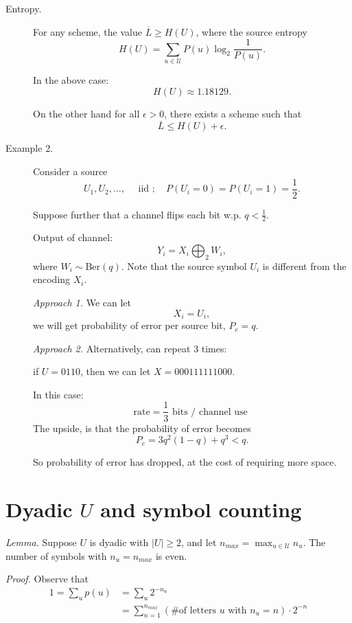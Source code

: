\documentclass[12pt]{extarticle}
\newcommand{\UU}{\mathcal{U}}
\def\UU{\mathcal{U}}
\begin{document}
\begin{description}
  \item[Entropy.] For any scheme, the value $\overline{L} \geq H(U)$, where the source entropy
    \[
      H(U) = \sum_{u \in \mathcal{U}} P(u) \log_2 \frac{1}{P(u)}.
    \]

    In the above case:
    \[
    H(U) \approx 1.18129.
    \]

    On the other hand for all $\epsilon > 0$, there exists a scheme such that
    \[
      \overline{L} \leq H(U) + \epsilon.
    \]

  \item[Example 2.] Consider a source
    \[
      U_1, U_2, \dots, \quad \text{ iid }; \quad P(U_i = 0) = P(U_i = 1) = \frac{1}{2}.
    \]

    Suppose further that a channel flips each bit w.p. $q < \frac{1}{2}$.

    Output of channel:
    \[
      Y_i = X_i \bigoplus_2 W_i,
    \]
    where $W_i \sim \text{Ber}(q)$.  Note that the source symbol $U_i$ is different from the encoding $X_i$.

    {\it Approach 1.} We can let
    \[
      X_i = U_i,
    \]
    we will get probability of error per source bit, $P_e = q$.

    {\it Approach 2.} Alternatively, can repeat $3$ times:

    if $U = 0 1 1 0$, then we can let $X = 000 111 111 000$.

    In this case:
    \[
      \text{rate} = \frac{1}{3} \text{ bits / channel use }
    \]
    The upside, is that the probability of error becomes
    \[
      P_e = 3 q^2 (1-q) + q^3 < q.
    \]

    So probability of error has dropped, at the cost of requiring more space.

\end{description}

\section{Dyadic $U$ and symbol counting}

{\it Lemma.} Suppose $U$ is dyadic with $|U| \geq 2$, and let $n_{max} = \max_{u \in \UU} n_u$.  The number of symbols with $n_u = n_{max}$ is even.

{\it Proof.} Observe that
\begin{align*}
  1 = \sum_{u} p(u) &= \sum_{u} 2^{-n_u} \\
  &= \sum_{n=1}^{n_{max}} (\text{\# of letters $u$ with $n_u = n$}) \cdot 2^{-n}  \\
\end{align*}
\end{document}
